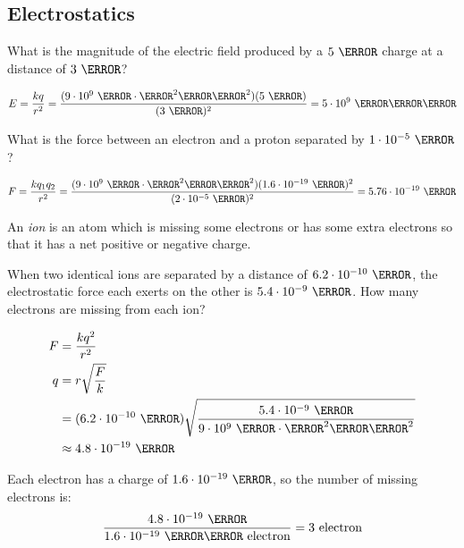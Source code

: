 \documentclass[fleqn,addpoints]{exam}
\begin{document}
\begin{questions}

\section{Electrostatics}

\question[5]
What is the magnitude of the electric field produced by a $5 \ \coulomb$ charge at a distance of $3 \ \meter$?
\begin{solution}
\[
  E = \frac{kq}{r^2} = \frac{(9 \cdot 10^9 \ \newton \cdot \meter^2 \per \coulomb^2)(5 \ \coulomb)}{(3 \ \meter)^2} 
    = 5 \cdot 10^9 \ \newton \per \coulomb
\]
\end{solution}
 
\question[5]
What is the force between an electron and a proton separated by $1 \cdot 10^{-5} \ \meter$?
\begin{solution}
\[
  F = \frac{kq_1q_2}{r^2} = \frac{(9 \cdot 10^9 \ \newton \cdot \meter^2 \per \coulomb^2)(1.6 \cdot 10^{-19} \ \coulomb)^2}{(2 \cdot 10^{-5} \ \meter)^2} 
    = 5.76 \cdot 10^{-19} \ \newton
\]
\end{solution}

\question[5]
An {\em ion} is an atom which is missing some electrons or has some extra electrons so that it has a net positive or
negative charge.  

When two identical ions are separated by a distance of $6.2 \cdot 10^{-10} \ \meter$, the electrostatic
force each exerts on the other is $5.4 \cdot 10^{-9} \ \newton$.  How many electrons are missing from each ion?

\begin{solution}
\begin{align*}
  F &= \frac{kq^2}{r^2} \\
  q &= r \sqrt{ \frac{F}{k} } \\
    &= (6.2 \cdot 10^{-10} \ \meter) \sqrt{ \frac{5.4 \cdot 10^{-9} \ \newton}{9 \cdot 10^9 \ \newton \cdot \meter^2 \per \coulomb^2} } \\
    &\approx 4.8 \cdot 10^{-19} \ \coulomb \\
\end{align*}

Each electron has a charge of $1.6 \cdot 10^{-19} \ \coulomb$, so the number of missing electrons is:
\[
  \frac{4.8 \cdot 10^{-19} \ \coulomb}{1.6 \cdot 10^{-19} \ \coulomb \per \text{ electron}} = 3 \text{ electron}
\]

\end{solution}


\end{questions}
\end{document}

